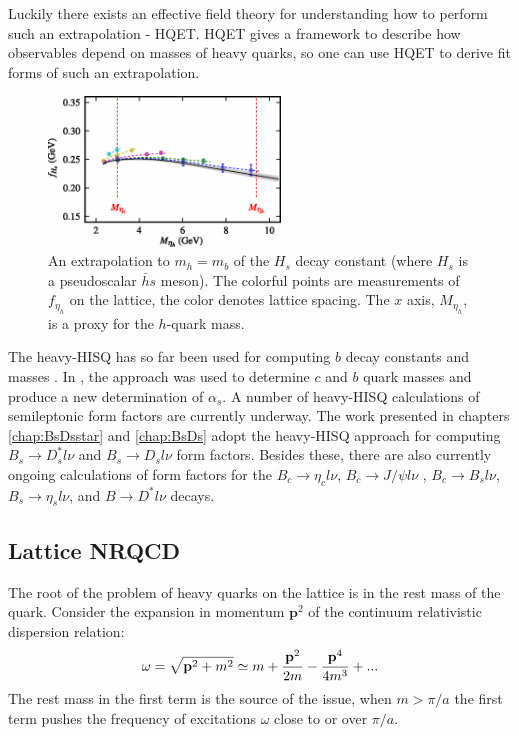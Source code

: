     Luckily there exists an effective field theory for understanding how to perform such an extrapolation - HQET. HQET gives a framework to describe how observables depend on masses of heavy quarks, so one can use HQET to derive fit forms of such an extrapolation.

    \begin{figure}
      \begin{center}
        \includegraphics[width=
          0.55\textwidth]{images/fHs_heavyhisq.png}
      \end{center}
      \vspace{-5pt}
      \caption{An extrapolation to $m_h=m_b$ of the $H_s$ decay constant (where $H_s$ is a pseudoscalar $\bar{h}s$ meson)\cite{McNeile:2012qf}. The colorful points are measurements of $f_{\eta_h}$ on the lattice, the color denotes lattice spacing. The $x$ axis, $M_{\eta_h}$, is a proxy for the $h$-quark mass. \label{fig:McNeile}}
    \end{figure}

    The heavy-HISQ has so far been used for computing $b$ decay constants and masses \cite{McNeile:2011ng,McNeile:2012qf,Bazavov:2017lyh}. In \cite{McNeile:2010ji}, the approach was used to determine $c$ and $b$ quark masses and produce a new determination of $\alpha_s$. A number of heavy-HISQ calculations of semileptonic form factors are currently underway. The work presented in chapters \ref{chap:BsDsstar} and \ref{chap:BsDs} adopt the heavy-HISQ approach for computing $B_s\to D_s^*l\nu$ and $B_s\to D_sl\nu$ form factors. Besides these, there are also currently ongoing calculations of form factors for the $B_c\to \eta_cl\nu$, $B_c\to J/\psi l\nu$ \cite{Lytle:2016ixw}, $B_c\to B_sl\nu$, $B_s\to \eta_sl\nu$, and $B\to D^*l\nu$ decays.

    \subsection{Lattice NRQCD}

    The root of the problem of heavy quarks on the lattice is in the rest mass of the quark. Consider the expansion in momentum $\textbf{p}^2$ of the continuum relativistic dispersion relation:
    \begin{align}
      \omega = \sqrt{{\textbf{p}}^2 + m^2} \simeq m + {{\textbf{p}}^2\over 2m} - {{\textbf{p}}^4\over 4m^3} + ...
      \label{eq:rel_expansion}
    \end{align}
The rest mass in the first term is the source of the issue, when $m > \pi/a$ the first term pushes the frequency of excitations $\omega$ close to or  over $\pi/a$.

